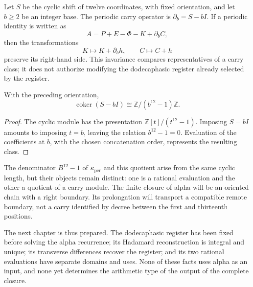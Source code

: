 Let \(S\) be the cyclic shift of twelve coordinates, with fixed
orientation, and let \(b\geq2\) be an integer base. The periodic carry
operator is \(\partial_b=S-bI\). If a periodic identity is written as
\[
 A=P+E-\Phi-K+\partial_bC,
\]
then the transformations
\[
 K\longmapsto K+\partial_bh,\qquad C\longmapsto C+h
\]
preserve its right-hand side. This invariance compares representatives of a
carry class; it does not authorize modifying the dodecaphasic register already
selected by the register.

\begin{proposition}
\label{prop:k-cociente-acarreo}
With the preceding orientation,
\[
 \operatorname{coker}(S-bI)\cong\mathbb Z/(b^{12}-1)\mathbb Z.
\]
\end{proposition}

\begin{proof}
The cyclic module has the presentation
\(\mathbb Z[t]/(t^{12}-1)\). Imposing \(S=bI\) amounts to imposing
\(t=b\), leaving the relation \(b^{12}-1=0\). Evaluation of the
coefficients at \(b\), with the chosen concatenation order, represents
the resulting class.
\end{proof}

The denominator \(B^{12}-1\) of \(\kappa_{\mathrm{per}}\) and this
quotient arise from the same cyclic length, but their objects remain
distinct: one is a rational evaluation and the other a quotient
of a carry module. The finite closure of alpha will be an oriented
chain with a right boundary. Its prolongation will transport a
compatible remote boundary, not a carry identified by decree
between the first and thirteenth positions.

The next chapter is thus prepared. The dodecaphasic register has been fixed before
solving the alpha recurrence; its Hadamard reconstruction is
integral and unique; its transverse differences recover the register; and
its two rational evaluations have separate domains and uses. None
of these facts uses alpha as an input, and none yet determines the
arithmetic type of the output of the complete closure.
